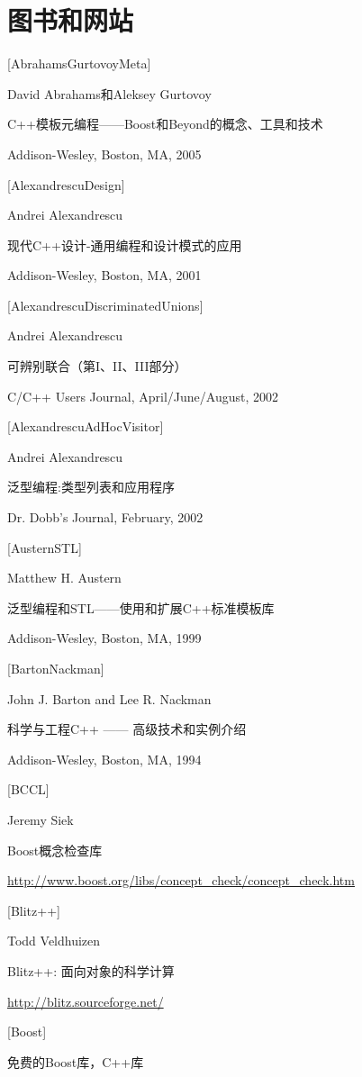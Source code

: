 \section*{图书和网站}

{[AbrahamsGurtovoyMeta]}

David Abrahams和Aleksey Gurtovoy

C++模板元编程——Boost和Beyond的概念、工具和技术
 
Addison-Wesley, Boston, MA, 2005

{[AlexandrescuDesign]}

Andrei Alexandrescu

现代C++设计-通用编程和设计模式的应用

Addison-Wesley, Boston, MA, 2001

{[AlexandrescuDiscriminatedUnions]}

Andrei Alexandrescu

可辨别联合（第I、II、III部分）

C/C++ Users Journal, April/June/August, 2002

{[AlexandrescuAdHocVisitor]}

Andrei Alexandrescu

泛型编程:类型列表和应用程序

Dr. Dobb's Journal, February, 2002

{[AusternSTL]}

Matthew H. Austern

泛型编程和STL——使用和扩展C++标准模板库

Addison-Wesley, Boston, MA, 1999

{[BartonNackman]}

John J. Barton and Lee R. Nackman

科学与工程C++ —— 高级技术和实例介绍

Addison-Wesley, Boston, MA, 1994

{[BCCL]}

Jeremy Siek

Boost概念检查库

\url{http://www.boost.org/libs/concept_check/concept_check.htm}

{[Blitz++]}

Todd Veldhuizen

Blitz++: 面向对象的科学计算

\url{http://blitz.sourceforge.net/}

{[Boost]}

免费的Boost库，C++库

